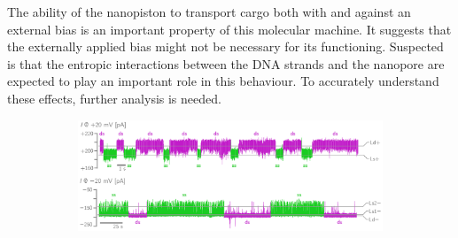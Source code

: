 The ability of the nanopiston to transport cargo both with and against an external bias
is an important property of this molecular machine. It suggests that the externally
applied bias might not be necessary for its functioning. Suspected is that the entropic
interactions between the DNA strands and the nanopore are expected to play an important
role in this behaviour. To accurately understand these effects, further analysis is
needed.
\begin{figure}[ht!]
  \begin{centering}
  \begin{subfigure}[t]{\dimexpr.95\linewidth-1.3em\relax}
  \centering
  \includegraphics[width=\linewidth,valign=t]{Figures/FluctuationRotaxane.png}
  \end{subfigure}%
  \vspace{0.6cm}
  \begin{subfigure}[t]{\dimexpr.5\linewidth-1.3em\relax}
  \centering

\end{subfigure}
\end{centering}
\end{figure}
